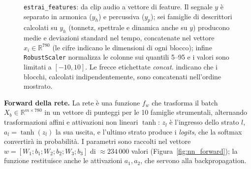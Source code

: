 \documentclass[a4paper,12pt]{article}
\numberwithin{equation}{section}
\numberwithin{figure}{section}
\numberwithin{table}{section}
\begin{document}
\begin{figure}[H]
{}
\caption{\texttt{estrai\_features}: da clip audio a vettore di feature. Il
segnale $y$ è separato in armonica ($y_h$) e percussiva ($y_p$); sei famiglie
di descrittori calcolati su $y_h$ (tonnetz, spettrale e dinamica anche su $y$)
producono medie e deviazioni standard nel tempo, concatenate nel vettore
$x_i \in \mathbb{R}^{780}$ (le cifre indicano le dimensioni di ogni blocco);
infine \texttt{RobustScaler} normalizza le colonne sui quantili 5--95 e i
valori sono limitati a $[-10, 10]$. Le frecce etichettate \emph{concat.}
indicano che i blocchi, calcolati indipendentemente, sono concatenati
nell'ordine mostrato.}
\label{fig:nn_features}
\end{figure}
\textbf{Forward della rete.}
La rete è una funzione $f_w$ che trasforma il batch $X_b \in \mathbb{R}^{m\times 780}$
in un vettore di punteggi per le 10 famiglie strumentali, alternando
trasformazioni affini e attivazioni non lineari $\tanh$: $z_l$ è l'ingresso
dello strato $l$, $a_l = \tanh(z_l)$ la sua uscita, e l'ultimo strato produce
i \emph{logits}, che la softmax convertirà in probabilità. I parametri sono
raccolti nel vettore $w = [W_1; b_1; W_2; b_2; W_3; b_3]$ di
$\approx 234\,000$ valori (Figura~\ref{fig:nn_forward}); la funzione restituisce
anche le attivazioni $a_1, a_2$, che servono alla backpropagation.
\end{document}
